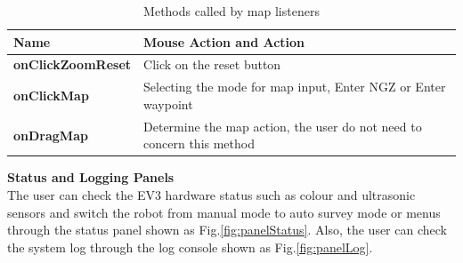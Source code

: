 \begin{table}[]
	\centering
	\caption{Methods called by map listeners}
	\label{Methods called by map listeners}
	\begin{tabular}{|l|l|}
		\hline
		\textbf{Name}             & Mouse Action and Action                                                                                                                                                                                                                             \\ \hline
		\textbf{onClickZoomReset} & Click on the reset button                                                                                                                                                                                                                           \\ \hline
		\textbf{onClickMap}       & Selecting the mode for map input, Enter NGZ or Enter waypoint \\ \hline
		\textbf{onDragMap}        & Determine the map action, the user do not need to concern this method                                                                                                                                                                               \\ \hline
	\end{tabular}
\end{table}

\textbf{Status and Logging Panels}\\
The user can check the EV3 hardware status such as colour and ultrasonic sensors and switch the robot from manual mode to auto survey mode or menus through the status panel shown as Fig.\ref{fig:panelStatus}. Also, the user can check the system log through the log console shown as Fig.\ref{fig:panelLog}.

